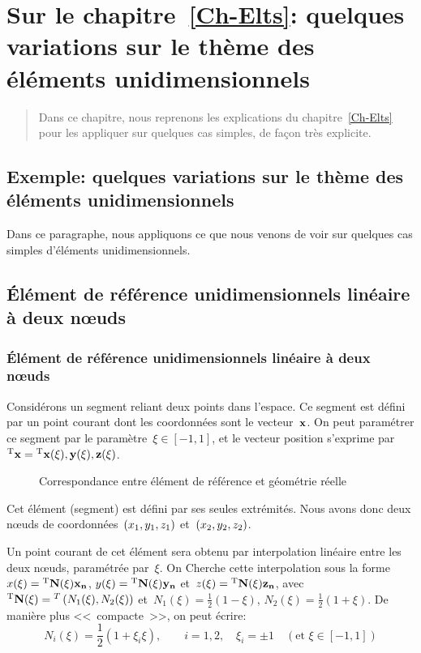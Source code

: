 \ifVersionAvecExemplesSepares
  \chapter{Sur le chapitre~\ref{Ch-Elts}: quelques variations sur le thème des éléments unidimensionnels}
  \begin{abstract}
  Dans ce chapitre, nous reprenons les explications du chapitre~\ref{Ch-Elts} pour les appliquer
  sur quelques cas simples, de façon très explicite.
  \end{abstract}
\else
  \section{Exemple: quelques variations sur le thème des éléments unidimensionnels}

  Dans ce paragraphe, nous appliquons ce que nous venons de voir sur quelques cas simples d'éléments unidimensionnels.
\fi

\medskipvm
\ifVersionAvecExemplesSepares
  \section{Élément de référence unidimensionnels linéaire à deux nœuds}\label{Sec-Elt1D2}
\else
  \subsection{Élément de référence unidimensionnels linéaire à deux nœuds}\label{Sec-Elt1D2}
\fi

Considérons un segment reliant deux points dans l'espace.
Ce segment est défini par un point courant dont les coordonnées sont le vecteur~$\VV{x}$.
On peut paramétrer ce segment par le paramètre~$\xi \in [-1,1]$, et le vecteur
position s'exprime par~${}^\mathrm{T}\mathbf{x}={}^\mathrm{T}\mathbf{x(\xi), y(\xi), z(\xi)}$.
\begin{figure}[ht]\centering\small
    \hspace{5em}
   \caption{Correspondance entre élément de référence et géométrie réelle}\label{fig-e1rr}
\end{figure}
\ifVersionDuDocEstVincent

\medskipvm\fi
Cet élément (segment) est défini par ses seules extrémités. Nous avons donc deux
nœuds de coordonnées~$\left(x_1, y_1, z_1\right)$ et~$\left(x_2, y_2, z_2\right)$.\ifVersionDuDocEstVincent\par\fi
Un point courant de cet élément sera obtenu par interpolation linéaire entre les deux nœuds,
paramétrée par~$\xi$. On Cherche cette interpolation sous la forme~$x(\xi)=\LL{N(\xi)}\VV{x_n}$, $y(\xi)=\LL{N(\xi)}\VV{y_n}$ et~$z(\xi)=\LL{N(\xi)}\VV{z_n}$, avec
${}^\mathrm{T}\mathbf{N(\xi)}={}^T\left( N_1(\xi), N_2(\xi)\right)$ et~$N_1(\xi)=\frac12 (1-\xi)$, $N_2(\xi)=\frac12(1+\xi)$.
De manière plus <<~compacte~>>, on peut écrire:
\begin{equation} N_i(\xi)=\frac12(1+\xi_i\xi), \qquad i=1,2, \quad \xi_i=\pm1 \quad (\text{et } \xi\in[-1,1]) \end{equation}
\ifVersionDuDocEstVincent


